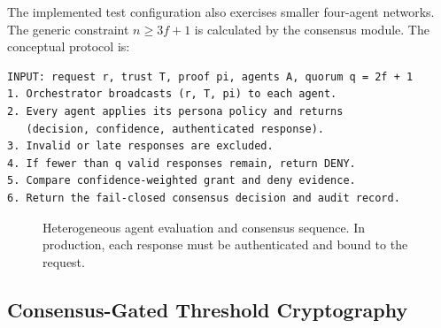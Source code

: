 \documentclass[10pt]{article}
\begin{document}
The implemented test configuration also exercises smaller four-agent networks. The generic constraint $n\geq3f+1$ is calculated by the consensus module. The conceptual protocol is:

\begin{minipage}{\textwidth}
\begin{lstlisting}[caption={BFT-oriented multi-agent authorization protocol},label={alg:consensus}]
INPUT: request r, trust T, proof pi, agents A, quorum q = 2f + 1
1. Orchestrator broadcasts (r, T, pi) to each agent.
2. Every agent applies its persona policy and returns
   (decision, confidence, authenticated response).
3. Invalid or late responses are excluded.
4. If fewer than q valid responses remain, return DENY.
5. Compare confidence-weighted grant and deny evidence.
6. Return the fail-closed consensus decision and audit record.
\end{lstlisting}
\end{minipage}

\begin{figure}[ht]
\centering
{}
\caption{Heterogeneous agent evaluation and consensus sequence. In production, each response must be authenticated and bound to the request.}
\label{fig:quorum}
\end{figure}

\subsection*{Consensus-Gated Threshold Cryptography}
\end{document}

